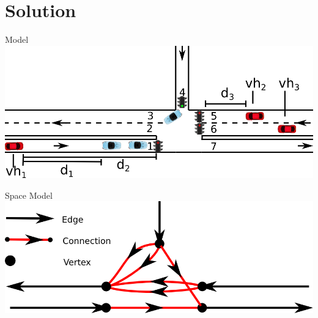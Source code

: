 
\section{Solution}
\begin{frame}{Model}
\includegraphics[width=1\textwidth]{images/introNetwork.png}
\end{frame}

\begin{frame}{Space Model}
\includegraphics[width=1\textwidth]{images/ConnectionNetwork.png}
\end{frame}